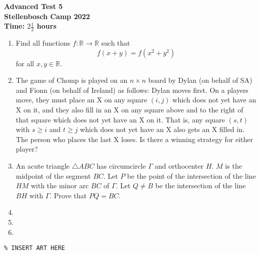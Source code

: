\documentclass{article}
\begin{document}
\thispagestyle{empty}

\begin{center}
  \textbf{\Large Advanced Test 5}
  \\ \vspace{1em}
  \textbf{\large Stellenbosch Camp 2022}
  \\ \vspace{1em}
  \textbf{\large Time: $2\frac{1}{2}$ hours}
\end{center}

\bigskip \bigskip

\begin{enumerate}[itemsep=\fill]

\item %
Find all functions $f : \mathbb{R} \to \mathbb{R}$ such that \[ f(x+y) = f(x^2+y^2) \] for all $x,y \in \mathbb{R}$.

 
\item %
The game of Chomp is played on an $n \times n$ board by Dylan (on behalf of SA) and Fionn (on behalf of Ireland) as follows: Dylan moves first. On a players move, they must place an X on any square $(i, j)$ which does not yet have an X on it, and they also fill in an X on any square above and to the right of that square which does not yet have an X on it. That is, any square $(s, t)$ with $s \geq i$ and $t \geq j$ which does not yet have an X also gets an X filled in. The person who places the last X loses. Is there a winning strategy for either player?


\item %
An acute triangle $\triangle ABC$ has circumcircle $\Gamma$ and orthocenter $H$. $M$ is the midpoint of the segment $BC$. Let $P$ be the point of the intersection of the line $HM$ with the minor arc $BC$ of $\Gamma$. Let $Q \neq B$ be the intersection of the line $BH$ with $\Gamma$. Prove that $PQ = BC$.

\item %


\item %


\item %

\end{enumerate}


\vfill
\centering
\small
\begin{BVerbatim}
\end{BVerbatim}
\end{document}
